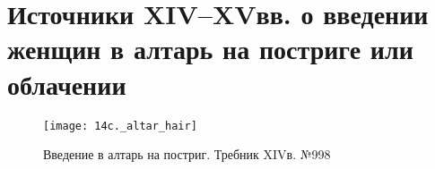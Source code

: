 \chapter{Источники XIV–XVвв. о введении женщин в алтарь на постриге или облачении}
\label{cha:appendix1}

\begin{figure}[h]
\texttt{[image: 14c.\_altar\_hair]}
\caption{Введение в алтарь на постриг. Требник XIVв. №998}
\label{14c._altar_hair}
\end{figure}

